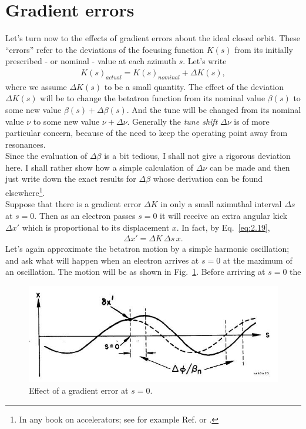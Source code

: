 \section{Gradient errors}\label{sec:2.11}

Let's turn now to the effects of gradient errors about the ideal closed orbit. These ``errors'' refer to the deviations of the focusing function $K(s)$ from its initially prescribed
- or nominal - value at each azimuth $s$. Let’s write
\begin{align}
	K(s)_{actual} = K(s)_{nominal} + \Delta K (s),
\end{align}
where we assume $\Delta K(s)$ to be a small quantity. The effect of the deviation $\Delta K(s)$ will be to change the betatron function from its nominal value $\beta(s)$ to some new value $\beta(s)+\Delta\beta(s)$. And the tune will be changed from its nominal value $\nu$ to some new value $\nu + \Delta\nu$. Generally the \emph{tune shift} $\Delta\nu$ is of more particular concern, because of the need to keep the operating point away from resonances.\\
Since the evaluation of $\Delta\beta$ is a bit tedious, I shall not give a rigorous deviation
here. I shall rather show how a simple calculation of $\Delta\nu$ can be made and then just write down the exact results for $\Delta\beta$ whose derivation can be found elsewhere\footnote{In any book on accelerators; see for example Ref. \cite{5} or \cite{7}.}.\\
Suppose that there is a gradient error $\Delta K$ in only a small azimuthal interval $\Delta s$ at $s = 0$. Then as an electron passes $s = 0$ it will receive an extra angular kick $\Delta x'$ which is proportional to its displacement $x$. In fact, by Eq.~\eqref{eq:2.19},
\begin{align}\label{eq:2.96}
	\Delta x' = \Delta K\, \Delta s\, x.
\end{align}
Let's again approximate the betatron motion by a simple harmonic oscillation; and ask what will happen when an electron arrives at $s = 0$ at the maximum of an oscillation. The motion will be as shown in Fig.~\ref{fig:fig23}. Before arriving at $s = 0$ the
\begin{figure}[!htb]
	\centering
	\includegraphics[width=0.8\linewidth]{./Figuras/fig23.jpeg}
	\caption{Effect of a gradient error at $s = 0$.}
	\label{fig:fig23}
\end{figure}
